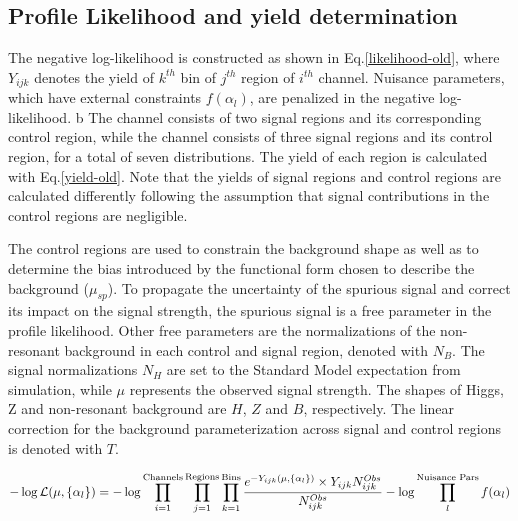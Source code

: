 \subsection{Profile Likelihood and yield determination}

The negative log-likelihood is constructed as shown in Eq.\ref{likelihood-old}, 
where $Y_{ijk}$ denotes the yield of $k^{th}$ bin of $j^{th}$ region of $i^{th}$ channel. 
Nuisance parameters, which have external constraints $f(\alpha_l)$, are penalized in the negative log-likelihood. 
b
The  \fourcentral{} channel consists of two signal regions and its corresponding control region, while the \twocentral{} channel consists of three signal regions and its control region,
for a total of seven \Mbb{} distributions.
The yield of each region is calculated with Eq.\ref{yield-old}.
Note that the yields of signal regions and control regions are calculated differently
following the assumption that signal contributions in the control regions are negligible. 

The control regions are used to constrain the background shape as well as to determine 
the bias introduced by the functional form chosen to describe the background ($\mu_{sp}$).
To propagate the uncertainty of the spurious signal and correct its impact on the signal strength, 
the spurious signal is a free parameter in the profile likelihood.
Other free parameters are the normalizations of the non-resonant background in each control and
signal region, denoted with $N_B$.
The signal normalizations $N_H$ are set to the Standard Model expectation from simulation,
while $\mu$ represents the observed signal strength.
The shapes of Higgs, Z and non-resonant background are $H$, $Z$ and $B$, respectively.
The linear correction for the background parameterization across signal and control regions is denoted with $T$. 

\begin{equation}
\label{likelihood-old}
-\log\mathcal{L}(\mu, \{\alpha_{l}\} )= -\log \prod_{i=1}^{\textnormal{Channels}} \prod_{j=1}^{\textnormal{Regions}} \prod_{k=1}^{\textnormal{Bins}} \frac{e^{-Y_{ijk}(\mu, \{\alpha_l\})} \times Y_{ijk}N_{ijk}^{Obs} }{N_{ijk}^{Obs}} - \log \prod_{l}^{\textnormal{Nuisance Pars}} f(\alpha_l)
\end{equation}

